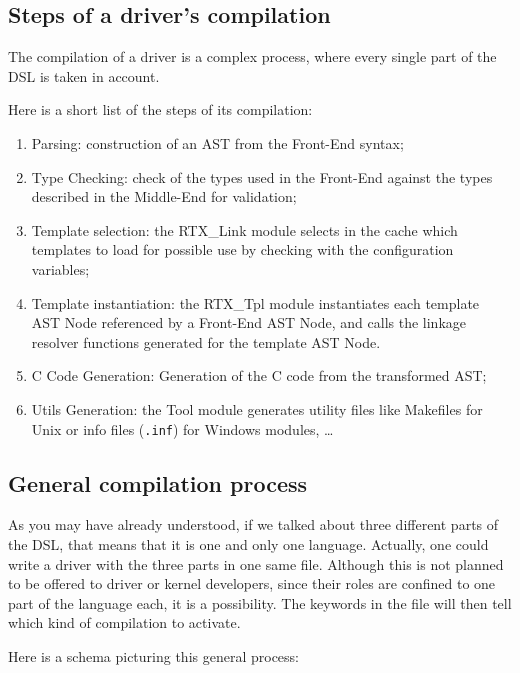 \documentclass[american]{rtxreport}
\begin{document}
\subsection{Steps of a driver's compilation}
\label{sec:driverCompilation}

The compilation of a driver is a complex process, where every single part of the
DSL is taken in account.

Here is a short list of the steps of its compilation:
\begin{enumerate}
    \item Parsing: construction of an AST from the Front-End syntax;
    \item Type Checking: check of the types used in the Front-End against the
        types described in the Middle-End for validation;
    \item Template selection: the RTX\_Link module selects in the cache which
        templates to load for possible use by checking with the configuration
        variables;
    \item Template instantiation: the RTX\_Tpl module instantiates each
        template AST Node referenced by a Front-End AST Node, and calls the
        linkage resolver functions generated for the template AST Node.
    \item C Code Generation: Generation of the C code from the transformed
        AST;
    \item Utils Generation: the Tool module generates utility files like
        Makefiles for Unix or info files (\texttt{.inf}) for Windows modules,
        \ldots
\end{enumerate}


\subsection{General compilation process}

As you may have already understood, if we talked about three different parts
of the DSL, that means that it is one and only one language. Actually, one could
write a driver with the three parts in one same file. Although this is not
planned to be offered to driver or kernel developers, since their roles are
confined to one part of the language each, it is a possibility. The keywords
in the file will then tell which kind of compilation to activate.

Here is a schema picturing this general process:
\end{document}
